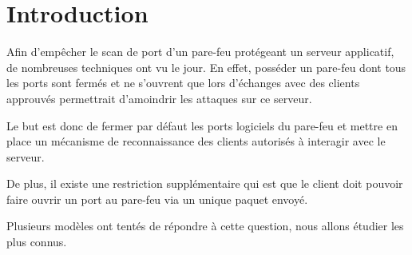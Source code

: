 \chapter*{Introduction}

Afin d'empêcher le scan de port d'un pare-feu protégeant un serveur applicatif, de nombreuses techniques ont vu le jour. En effet, posséder un pare-feu dont tous les ports sont fermés et ne s'ouvrent que lors d'échanges avec des clients approuvés permettrait d'amoindrir les attaques sur ce serveur.

Le but est donc de fermer par défaut les ports logiciels du pare-feu et mettre en place un mécanisme de reconnaissance des clients autorisés à interagir avec le serveur.

De plus, il existe une restriction supplémentaire qui est que le client doit pouvoir faire ouvrir un port au pare-feu via un unique paquet envoyé.

Plusieurs modèles ont tentés de répondre à cette question, nous allons étudier les plus connus.
